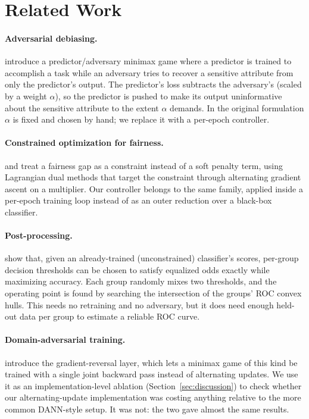 \documentclass[11pt]{article}
\begin{document}
\section{Related Work}

\paragraph{Adversarial debiasing.} \citet{zhang2018mitigating} introduce
a predictor/adversary minimax game where a predictor is trained to
accomplish a task while an adversary tries to recover a sensitive
attribute from only the predictor's output. The predictor's loss
subtracts the adversary's (scaled by a weight $\alpha$), so the predictor
is pushed to make its output uninformative about the sensitive attribute
to the extent $\alpha$ demands. In the original formulation $\alpha$ is
fixed and chosen by hand; we replace it with a per-epoch controller.

\paragraph{Constrained optimization for fairness.} \citet{agarwal2018reductions}
and \citet{cotter2019optimization} treat a fairness gap as a constraint
instead of a soft penalty term, using Lagrangian dual methods that
target the constraint through alternating gradient ascent on a
multiplier. Our controller belongs to the same family, applied inside a
per-epoch training loop instead of as an outer reduction over a
black-box classifier.

\paragraph{Post-processing.} \citet{hardt2016equality} show that, given
an already-trained (unconstrained) classifier's scores, per-group
decision thresholds can be chosen to satisfy equalized odds exactly while
maximizing accuracy. Each group randomly mixes two thresholds, and the
operating point is found by searching the intersection of the groups'
ROC convex hulls. This needs no retraining and no adversary, but it does
need enough held-out data per group to estimate a reliable ROC curve.

\paragraph{Domain-adversarial training.} \citet{ganin2015unsupervised}
introduce the gradient-reversal layer, which lets a minimax game of this
kind be trained with a single joint backward pass instead of alternating
updates. We use it as an implementation-level ablation
(Section~\ref{sec:discussion}) to check whether our alternating-update
implementation was costing anything relative to the more common
DANN-style setup. It was not: the two gave almost the same results.
\end{document}
